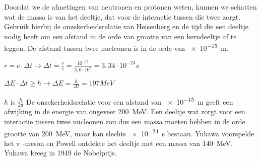 \begin{questions}

\question
Doordat we de afmetingen van neutronen en protonen weten, kunnen we schatten wat 
de massa is van het deeltje, dat voor de interactie tussen die twee zorgt.
Gebruik hierbij de onzekerheidsrelatie van Heisenberg en de tijd die een deeltje
nodig heeft om een afstand in de orde van grootte van een kerndeeltje af te leggen.
De afstand tussen twee nucleonen is in de orde van \SI{e-15}{m}.

\begin{solution}
 
$r = c \cdot \Delta t \rightarrow \Delta t = \frac{r}{c} = \frac{10^{-15}}{3,0\cdot 10^{8}}= 3,34\cdot 10^{-24} s$

$\Delta E \cdot \Delta t \geq \hbar \rightarrow \Delta E = \frac {\hbar}{\Delta t} = 197 MeV$

$\hbar$ is $ \frac{h}{2\pi}$ 
De onzekerheidsrelatie voor een afstand van \SI{e-15}{m} geeft een afwijking in de energie van 
ongeveer \SI{200}{\mega\electronvolt}. Een deeltje wat zorgt voor een interactie tussen 
twee nucleonen zou dus een massa moeten hebben in de orde grootte van \SI{200}{\mega\electronvolt},
maar kan slechts \SI{e-24}{\second} bestaan. Yukawa voorspelde het $\pi$ -meson en Powell ontdekte het deeltje 
met een massa van \SI{140}{\mega\electronvolt}. Yukawa kreeg in 1949 de Nobelprijs.
\end{solution}


\end{questions}
